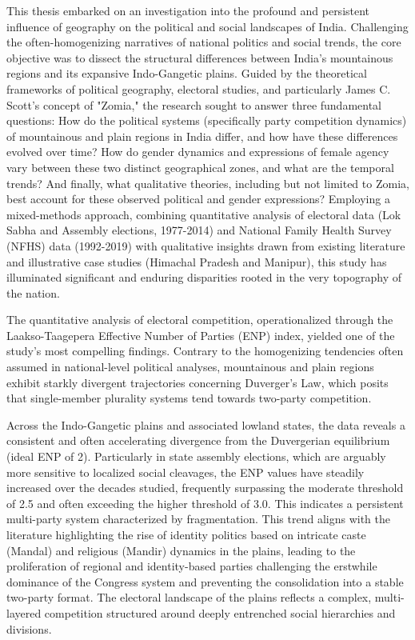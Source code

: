 
\begin{sloppypar}

This thesis embarked on an investigation into the profound and persistent influence of geography on the political and social landscapes of India. Challenging the often-homogenizing narratives of national politics and social trends, the core objective was to dissect the structural differences between India's mountainous regions and its expansive Indo-Gangetic plains. Guided by the theoretical frameworks of political geography, electoral studies, and particularly James C. Scott's concept of "Zomia," the research sought to answer three fundamental questions: How do the political systems (specifically party competition dynamics) of mountainous and plain regions in India differ, and how have these differences evolved over time? How do gender dynamics and expressions of female agency vary between these two distinct geographical zones, and what are the temporal trends? And finally, what qualitative theories, including but not limited to Zomia, best account for these observed political and gender expressions? Employing a mixed-methods approach, combining quantitative analysis of electoral data (Lok Sabha and Assembly elections, 1977-2014) and National Family Health Survey (NFHS) data (1992-2019) with qualitative insights drawn from existing literature and illustrative case studies (Himachal Pradesh and Manipur), this study has illuminated significant and enduring disparities rooted in the very topography of the nation.


The quantitative analysis of electoral competition, operationalized through the Laakso-Taagepera Effective Number of Parties (ENP) index, yielded one of the study's most compelling findings. Contrary to the homogenizing tendencies often assumed in national-level political analyses, mountainous and plain regions exhibit starkly divergent trajectories concerning Duverger's Law, which posits that single-member plurality systems tend towards two-party competition.

Across the Indo-Gangetic plains and associated lowland states, the data reveals a consistent and often accelerating divergence from the Duvergerian equilibrium (ideal ENP of 2). Particularly in state assembly elections, which are arguably more sensitive to localized social cleavages, the ENP values have steadily increased over the decades studied, frequently surpassing the moderate threshold of 2.5 and often exceeding the higher threshold of 3.0. This indicates a persistent multi-party system characterized by fragmentation. This trend aligns with the literature highlighting the rise of identity politics based on intricate caste (Mandal) and religious (Mandir) dynamics in the plains, leading to the proliferation of regional and identity-based parties challenging the erstwhile dominance of the Congress system and preventing the consolidation into a stable two-party format. The electoral landscape of the plains reflects a complex, multi-layered competition structured around deeply entrenched social hierarchies and divisions.


\end{sloppypar}
